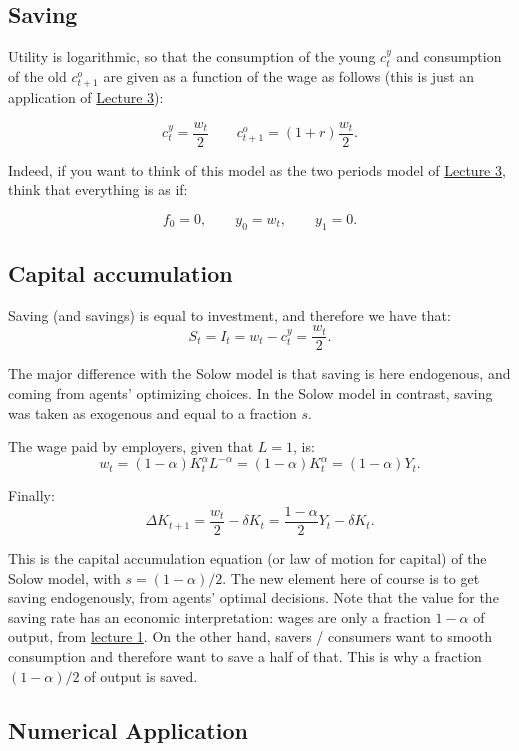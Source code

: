 \documentclass[]{book}
\theoremstyle{definition}
\theoremstyle{definition}
\theoremstyle{definition}
\theoremstyle{remark}
\begin{document}
\subsection{Saving}\label{saving}

Utility is logarithmic, so that the consumption of the young
\(c_{t}^{y}\) and consumption of the old \(c_{t+1}^{o}\) are given as a
function of the wage as follows (this is just an application of
\href{lecture3.html}{Lecture 3}):

\[c_{t}^{y}=\frac{w_{t}}{2}\qquad c_{t+1}^{o}=(1+r)\frac{w_{t}}{2}.\]

Indeed, if you want to think of this model as the two periods model of
\href{lecture3.html}{Lecture 3}, think that everything is as if:

\[f_{0}=0,\qquad y_{0}=w_{t},\qquad y_{1}=0.\]

\subsection{Capital accumulation}\label{capital-accumulation}

Saving (and savings) is equal to investment, and therefore we have that:
\[S_t = I_t = w_{t}-c_{t}^{y}=\frac{w_{t}}{2}.\]

The major difference with the Solow model is that saving is here
endogenous, and coming from agents' optimizing choices. In the Solow
model in contrast, saving was taken as exogenous and equal to a fraction
\(s\).

The wage paid by employers, given that \(L=1\), is:
\[w_{t}=(1-\alpha)K_{t}^{\alpha}L^{-\alpha}=(1-\alpha)K_{t}^{\alpha} = (1-\alpha)Y_t.\]

Finally:
\[\Delta K_{t+1}=\frac{w_{t}}{2}-\delta K_{t} = \frac{1-\alpha}{2}Y_t-\delta K_t.\]

This is the capital accumulation equation (or law of motion for capital)
of the Solow model, with \(s = (1-\alpha)/2\). The new element here of
course is to get saving endogenously, from agents' optimal decisions.
Note that the value for the saving rate has an economic interpretation:
wages are only a fraction \(1-\alpha\) of output, from
\href{lecture1.html}{lecture 1}. On the other hand, savers / consumers
want to smooth consumption and therefore want to save a half of that.
This is why a fraction \((1-\alpha)/2\) of output is saved.

\subsection{Numerical Application}\label{numerical-application}
\end{document}
